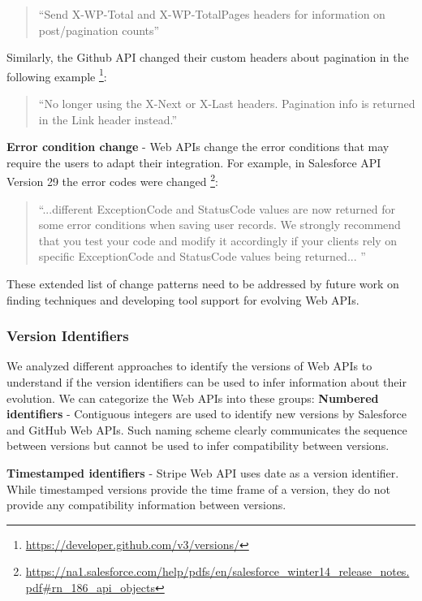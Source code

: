 \small
\begin{quotation}
``Send X-WP-Total and X-WP-TotalPages headers for information on post/pagination counts''
\end{quotation}
\normalsize

Similarly, the Github API changed their custom headers about pagination in the following example \footnote{\url{https://developer.github.com/v3/versions/}}:

\small
\begin{quotation}
``No longer using the X-Next or X-Last headers. Pagination info is returned in the Link header instead.''
\end{quotation}
\normalsize

\textbf{Error condition change} - Web APIs change the error conditions that may require the users to adapt their integration. For example, in Salesforce API Version 29 the error codes were changed \footnote{\url{https://na1.salesforce.com/help/pdfs/en/salesforce_winter14_release_notes.pdf\#rn_186_api_objects}}:

\small
\begin{quotation}
``...different ExceptionCode and StatusCode values are now returned for some error conditions
when saving user records. We strongly recommend that you test your code and modify it accordingly if your clients rely on specific ExceptionCode and StatusCode values being returned...
''\end{quotation}
\normalsize

These extended list of change patterns need to be addressed by future work on finding techniques and developing tool support for evolving Web APIs.


\subsubsection{Version Identifiers}

We analyzed different approaches to identify the versions of Web APIs to understand if the version identifiers can be used to infer information about their evolution. We can categorize the Web APIs into these groups:
\textbf{Numbered identifiers} - Contiguous integers are used to identify new versions by Salesforce and GitHub Web APIs. Such naming scheme clearly communicates the sequence between versions but cannot be used to infer compatibility between versions.

\textbf{Timestamped identifiers} - Stripe Web API uses date as a version identifier. While timestamped versions provide the time frame of a version, they do not provide any compatibility information between versions.

